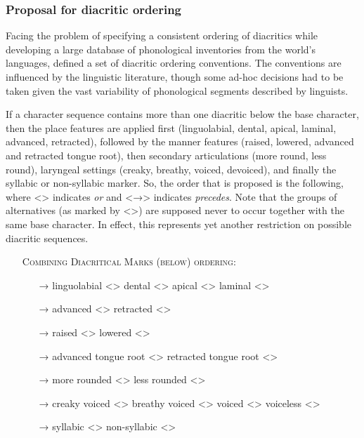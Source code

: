 \subsubsection*{Proposal for diacritic ordering}

Facing the problem of specifying a consistent ordering of diacritics while
developing a large database of phonological inventories from the world's
languages, \citet[540]{Moran2012} defined a set of diacritic ordering
conventions. The conventions are influenced by the linguistic literature, though
some ad-hoc decisions had to be taken given the vast variability of phonological segments 
described by linguists. 

If a character sequence contains more than one diacritic below the base
character, then the place features are applied first (linguolabial, dental,
apical, laminal, advanced, retracted), followed by the manner features (raised,
lowered, advanced and retracted tongue root), then
secondary articulations (more round, less round), laryngeal settings (creaky,
breathy, voiced, devoiced), and finally the syllabic or non-syllabic marker. So,
the order that is proposed is the following, where <\textbar{}> indicates
\textit{or} and <→> indicates \textit{precedes}. Note that the groups of 
alternatives (as marked by <\textbar{}>) are supposed never to occur together 
with the same base character. In effect, this represents yet another restriction 
on possible diacritic sequences.

\begin{itemize}
	\item[] \textsc{Combining Diacritical Marks (below) ordering:}
	\begin{itemize}	
	  \item[→] linguolabial <> \textbar{} dental <> \textbar{} apical <> \textbar{} laminal <>
	  \item[→] advanced <> \textbar{} retracted <> 
	  \item[→] raised <> \textbar{} lowered <>
	  \item[→] advanced tongue root <> \textbar{} retracted tongue root <>
	  \item[→] more rounded <> \textbar{} less rounded <>
	  \item[→] creaky voiced <> \textbar{} breathy voiced <> \textbar{} voiced <> \textbar{} voiceless <>
	  \item[→] syllabic <> \textbar{} non-syllabic <>
	\end{itemize}
 \end{itemize}

